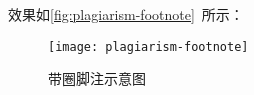 \begin{latex}
\usepackage{xunicode-addon}
\newfontfamily{} %
\newCJKfontfamily{} %
\renewcommand\thefootnote{{\fnmarkfont\fnCJKmarkfont\textcircled{\arabic{footnote}}}}
\end{latex}

效果如\autoref{fig:plagiarism-footnote}~所示：

\begin{figure}[!htbp]
    \centering
    \texttt{[image: plagiarism-footnote]}
    \caption{带圈脚注示意图}
    \label{fig:plagiarism-footnote}
\end{figure}






